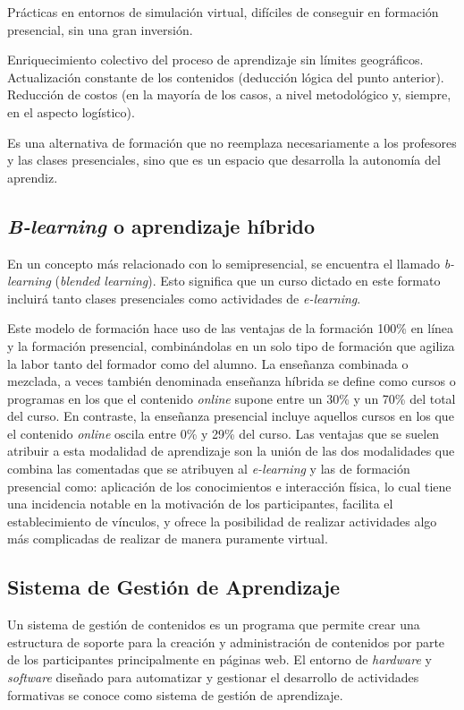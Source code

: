 Prácticas en entornos de simulación virtual, difíciles de conseguir en formación presencial, sin una gran inversión.

Enriquecimiento colectivo del proceso de aprendizaje sin límites geográficos.
Actualización constante de los contenidos (deducción lógica del punto anterior).
Reducción de costos (en la mayoría de los casos, a nivel metodológico y, siempre, en el aspecto logístico).

Es una alternativa de formación que no reemplaza necesariamente a los profesores y las clases presenciales, sino que es un espacio que desarrolla la autonomía del aprendiz.

\subsection{\emph{B-learning} o aprendizaje híbrido}

En un concepto más relacionado con lo semipresencial, se encuentra el llamado \emph{b-learning} (\emph{blended learning}). Esto significa que un curso dictado en este formato incluirá tanto clases presenciales como actividades de \emph{e-learning}\cite{bib:blearning}. 

Este modelo de formación hace uso de las ventajas de la formación 100\% en línea y la formación presencial, combinándolas en un solo tipo de formación que agiliza la labor tanto del formador como del alumno. La enseñanza combinada o mezclada, a veces también denominada enseñanza híbrida se define como cursos o programas en los que el contenido \emph{online} supone entre un 30\% y un 70\% del total del curso. En contraste, la enseñanza presencial incluye aquellos cursos en los que el contenido \emph{online} oscila entre 0\% y 29\% del curso. Las ventajas que se suelen atribuir a esta modalidad de aprendizaje son la unión de las dos modalidades que combina las comentadas que se atribuyen al \emph{e-learning} y las de formación presencial como: aplicación de los conocimientos e interacción física, lo cual tiene una incidencia notable en la motivación de los participantes, facilita el establecimiento de vínculos, y ofrece la posibilidad de realizar actividades algo más complicadas de realizar de manera puramente virtual.

\subsection{Sistema de Gestión de Aprendizaje}

Un sistema de gestión de contenidos es un programa que permite crear una estructura de soporte para la creación y administración de contenidos por parte de los participantes principalmente en páginas web. El entorno de \emph{hardware} y \emph{software} diseñado para automatizar y gestionar el desarrollo de actividades formativas se conoce como sistema de gestión de aprendizaje\cite{bib:lms}. 

